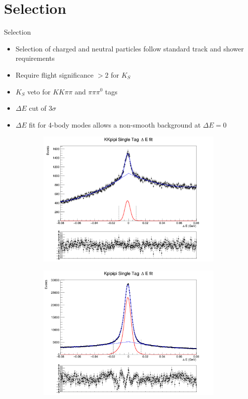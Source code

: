 \documentclass{beamer}
\begin{document}
\section{Selection}
\begin{frame}{Selection}
  \begin{itemize}
    \item{Selection of charged and neutral particles follow standard track and shower requirements}
    \item{Require flight significance $> 2$ for $K_S$}
    \item{$K_S$ veto for $KK\pi\pi$ and $\pi\pi\pi^0$ tags}
    \item{$\Delta E$ cut of $3\sigma$}
    \item{$\Delta E$ fit for 4-body modes allows a non-smooth background at $\Delta E = 0$}
  \end{itemize}
  \begin{figure}
    \centering
    \begin{subfigure}{0.5\textwidth}
      \centering
      \includegraphics[width=\textwidth, clip = true, trim = {0 11cm 0 0 }]{Plots/KKpipi_SingleTag_DeltaE_Plot.png}
    \end{subfigure}%
    \begin{subfigure}{0.5\textwidth}
      \centering
      \includegraphics[width=\textwidth, clip = true, trim = {0 11cm 0 0 }]{Plots/Kpipipi_SingleTag_DeltaE_Plot.png}

\end{subfigure}
\end{figure}
\end{frame}
\end{document}
